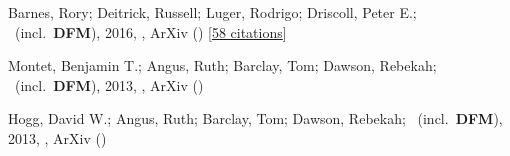 \item[{\color{numcolor}\scriptsize3}] Barnes, Rory; Deitrick, Russell; Luger, Rodrigo; Driscoll, Peter E.; \etal\ (incl.\ \textbf{DFM}), 2016, , ArXiv () [\href{https://ui.adsabs.harvard.edu/abs/2016arXiv160806919B}{58 citations}]

\item[{\color{numcolor}\scriptsize2}] Montet, Benjamin T.; Angus, Ruth; Barclay, Tom; Dawson, Rebekah; \etal\ (incl.\ \textbf{DFM}), 2013, , ArXiv ()

\item[{\color{numcolor}\scriptsize1}] Hogg, David W.; Angus, Ruth; Barclay, Tom; Dawson, Rebekah; \etal\ (incl.\ \textbf{DFM}), 2013, , ArXiv ()